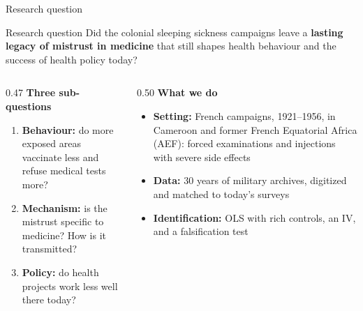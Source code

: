 \documentclass[aspectratio=1610]{beamer}
\begin{document}
\begin{frame}{Research question}
  \begin{block}{Research question}
    Did the colonial sleeping sickness campaigns leave a \textbf{lasting legacy of mistrust in medicine}
    that still shapes health behaviour and the success of health policy today?
  \end{block}
  \vspace{0.2em}
  \begin{columns}[T]
    \begin{column}{0.47\textwidth}
      \textbf{Three sub-questions}
      \begin{enumerate}
        \item \textbf{Behaviour:} do more exposed areas vaccinate less and refuse medical tests more?
        \item \textbf{Mechanism:} is the mistrust specific to medicine? How is it transmitted?
        \item \textbf{Policy:} do health projects work less well there today?
      \end{enumerate}
    \end{column}
    \begin{column}{0.50\textwidth}
      \textbf{What we do}
      \begin{itemize}
        \item \textbf{Setting:} French campaigns, 1921--1956, in Cameroon and former French Equatorial
          Africa (AEF): forced examinations and injections with severe side effects
        \item \textbf{Data:} 30 years of military archives, digitized and matched to today's surveys
        \item \textbf{Identification:} OLS with rich controls, an IV, and a falsification test
      \end{itemize}
    \end{column}
  \end{columns}
\end{frame}
\end{document}
